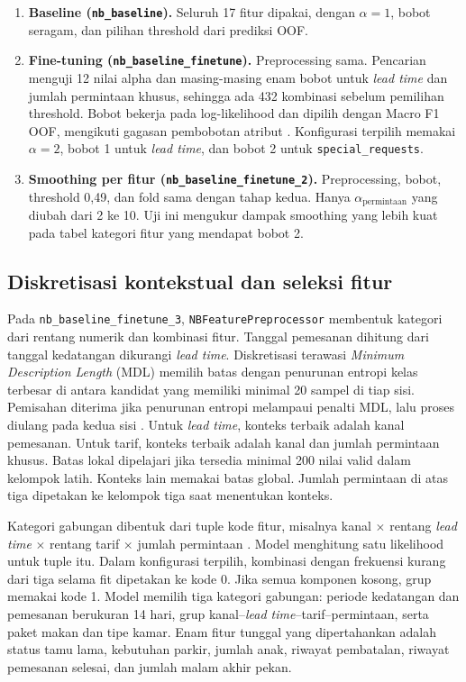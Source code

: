 \begin{enumerate}
  \item \textbf{Baseline (\texttt{nb\_baseline}).} Seluruh 17 fitur dipakai, dengan \(\alpha=1\), bobot seragam, dan pilihan threshold dari prediksi OOF.
  \item \textbf{Fine-tuning (\texttt{nb\_baseline\_finetune}).} Preprocessing sama. Pencarian menguji 12 nilai alpha dan masing-masing enam bobot untuk \emph{lead time} dan jumlah permintaan khusus, sehingga ada 432 kombinasi sebelum pemilihan threshold. Bobot bekerja pada log-likelihood dan dipilih dengan Macro F1 OOF, mengikuti gagasan pembobotan atribut \cite{ref:zaidi_nb}. Konfigurasi terpilih memakai \(\alpha=2\), bobot 1 untuk \emph{lead time}, dan bobot 2 untuk \texttt{special\_requests}.
  \item \textbf{Smoothing per fitur (\texttt{nb\_baseline\_finetune\_2}).} Preprocessing, bobot, threshold 0,49, dan fold sama dengan tahap kedua. Hanya \(\alpha_{\text{permintaan}}\) yang diubah dari 2 ke 10. Uji ini mengukur dampak smoothing yang lebih kuat pada tabel kategori fitur yang mendapat bobot 2.
\end{enumerate}

\subsection{Diskretisasi kontekstual dan seleksi fitur}
Pada \texttt{nb\_baseline\_finetune\_3}, \texttt{NBFeaturePreprocessor} membentuk kategori dari rentang numerik dan kombinasi fitur. Tanggal pemesanan dihitung dari tanggal kedatangan dikurangi \emph{lead time}. Diskretisasi terawasi \emph{Minimum Description Length} (MDL) memilih batas dengan penurunan entropi kelas terbesar di antara kandidat yang memiliki minimal 20 sampel di tiap sisi. Pemisahan diterima jika penurunan entropi melampaui penalti MDL, lalu proses diulang pada kedua sisi \cite{ref:fayyad_nb}. Untuk \emph{lead time}, konteks terbaik adalah kanal pemesanan. Untuk tarif, konteks terbaik adalah kanal dan jumlah permintaan khusus. Batas lokal dipelajari jika tersedia minimal 200 nilai valid dalam kelompok latih. Konteks lain memakai batas global. Jumlah permintaan di atas tiga dipetakan ke kelompok tiga saat menentukan konteks.

Kategori gabungan dibentuk dari tuple kode fitur, misalnya kanal \(\times\) rentang \emph{lead time} \(\times\) rentang tarif \(\times\) jumlah permintaan \cite{ref:pazzani_nb}. Model menghitung satu likelihood untuk tuple itu. Dalam konfigurasi terpilih, kombinasi dengan frekuensi kurang dari tiga selama fit dipetakan ke kode 0. Jika semua komponen kosong, grup memakai kode 1. Model memilih tiga kategori gabungan: periode kedatangan dan pemesanan berukuran 14 hari, grup kanal--\emph{lead time}--tarif--permintaan, serta paket makan dan tipe kamar. Enam fitur tunggal yang dipertahankan adalah status tamu lama, kebutuhan parkir, jumlah anak, riwayat pembatalan, riwayat pemesanan selesai, dan jumlah malam akhir pekan.

